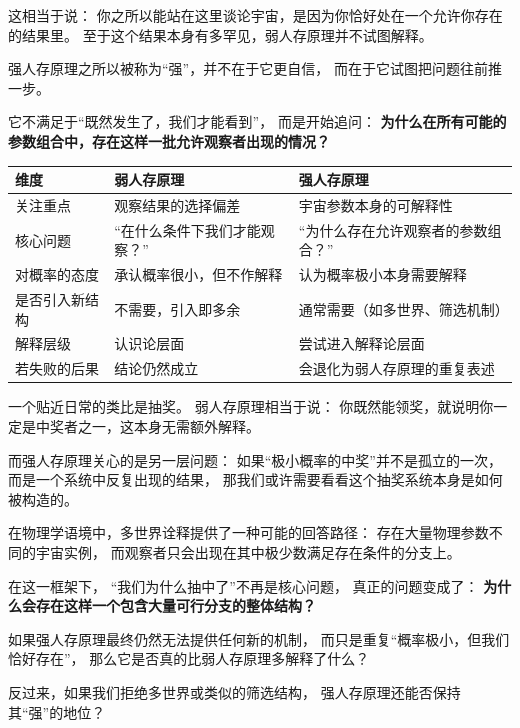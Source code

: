\documentclass[../main.tex]{subfiles}
\begin{document}
这相当于说：  
你之所以能站在这里谈论宇宙，是因为你恰好处在一个允许你存在的结果里。  
至于这个结果本身有多罕见，弱人存原理并不试图解释。

强人存原理之所以被称为“强”，并不在于它更自信，  
而在于它试图把问题往前推一步。

它不满足于“既然发生了，我们才能看到”，  
而是开始追问：  
\textbf{为什么在所有可能的参数组合中，存在这样一批允许观察者出现的情况？}

\begin{center}
	\begin{tabular}{|p{3cm}|p{5cm}|p{5cm}|}
		\hline
		\textbf{维度} & \textbf{弱人存原理} & \textbf{强人存原理} \\
		\hline
		关注重点 &
		观察结果的选择偏差 &
		宇宙参数本身的可解释性 \\
		\hline
		核心问题 &
		“在什么条件下我们才能观察？” &
		“为什么存在允许观察者的参数组合？” \\
		\hline
		对概率的态度 &
		承认概率很小，但不作解释 &
		认为概率极小本身需要解释 \\
		\hline
		是否引入新结构 &
		不需要，引入即多余 &
		通常需要（如多世界、筛选机制） \\
		\hline
		解释层级 &
		认识论层面 &
		尝试进入解释论层面 \\
		\hline
		若失败的后果 &
		结论仍然成立 &
		会退化为弱人存原理的重复表述 \\
		\hline
	\end{tabular}
\end{center}


一个贴近日常的类比是抽奖。  
弱人存原理相当于说：  
你既然能领奖，就说明你一定是中奖者之一，这本身无需额外解释。

而强人存原理关心的是另一层问题：  
如果“极小概率的中奖”并不是孤立的一次，  
而是一个系统中反复出现的结果，  
那我们或许需要看看这个抽奖系统本身是如何被构造的。

在物理学语境中，多世界诠释提供了一种可能的回答路径：  
存在大量物理参数不同的宇宙实例，  
而观察者只会出现在其中极少数满足存在条件的分支上。

在这一框架下，  
“我们为什么抽中了”不再是核心问题，  
真正的问题变成了：  
\textbf{为什么会存在这样一个包含大量可行分支的整体结构？}

\begin{tcolorbox}[colback=gray!8, colframe=gray!50, title=\textit{思考}]
	如果强人存原理最终仍然无法提供任何新的机制，  
	而只是重复“概率极小，但我们恰好存在”，  
	那么它是否真的比弱人存原理多解释了什么？
	
	反过来，如果我们拒绝多世界或类似的筛选结构，  
	强人存原理还能否保持其“强”的地位？
\end{tcolorbox}
\end{document}
